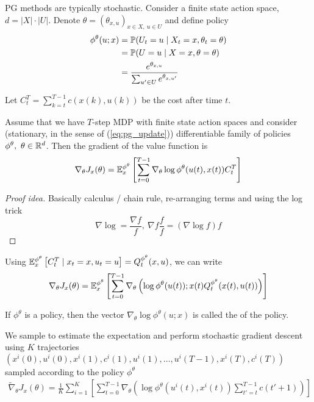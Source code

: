 PG methods are typically stochastic. Consider a finite state action space, \(d=|X|\cdot |U|\).
Denote \(\theta=(\theta_{x,u})_{x\in X,\ u\in U}\) and define  policy
\begin{align*}
    \phi^\theta(u;x)&=\mathbb{P}(U_t=u\mid X_t=x,\theta_t=\theta)\\
                    &=\mathbb{P}(U=u\mid X=x,\theta=\theta) \\
                    &=\frac{e^{\theta_{x,u}}}{\sum_{u'\in U} e^{\theta_{x,u'}}} 
\end{align*}


Let \(C_t^T=\sum_{k=t}^{T-1}c(x(k),u(k))\) be the cost after time \(t\).
\begin{theorem}\label{thm:54}
    Assume that we have \(T\)-step MDP with finite 
    state action spaces and consider (stationary, in the sense of (\ref{eq:pg_update})) differentiable family 
    of policies \(\phi^\theta,\ \theta\in \mathbb{R}^d\). Then the gradient 
    of the value function is 
    \[\nabla_\theta J_x(\theta)=\mathbb{E}_x^{\phi^\theta}\left[\sum_{t=0}^{T-1} \nabla_\theta\log \phi^\theta(u(t),x(t))C_t^T\right] \]
\end{theorem}

\begin{proof}[Proof idea]
    Basically calculus / chain rule, re-arranging terms and using the log trick 
    \[\nabla \log = \frac{\nabla f}{f},\ \nabla f\frac{f}{f}=(\nabla\log f)f\] 
\end{proof}

Using \(\mathbb{E}_x^{\phi^\theta}\left[C_t^T\mid x_t=x,u_t=u\right]=Q_t^{\phi^\theta}(x,u)\),
we can write \[\nabla_\theta J_x(\theta)=\mathbb{E}_x^{\phi^\theta}\left[\sum_{t=0}^{T-1}\nabla_\theta \left(\log \phi^\theta(u(t));x(t)Q_t^{\phi^\theta}(x(t),u(t))\right)\right]\]
\begin{definition*}
    If \(\phi^\theta\) is a policy, then the vector \(\nabla_\theta\log\phi^\theta(u;x)\)
    is  called the  of the policy.
\end{definition*}

We sample to estimate the expectation and perform stochastic gradient descent using 
\(K\) trajectories \((x^i(0),u^i(0),x^i(1),c^i(1),u^i(1),\dots, u^i(T-1),x^i(T),c^i(T))\) sampled according to
the policy \(\phi^\theta\)
\begin{align*}
    \tilde{\nabla}_\theta J_x(\theta)=\frac{1}{K}\sum_{i=1}^K\left[\sum_{t=0}^{T-1}\nabla_\theta \left(\log \phi^\theta(u^i(t),x^i(t))\sum_{t'=t}^{T-1}c(t'+1)\right)\right]
\end{align*}


